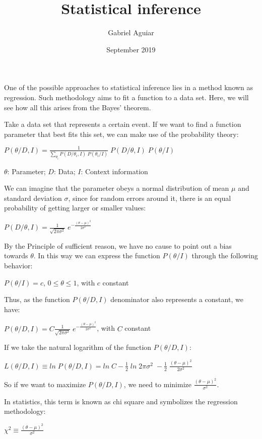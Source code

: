 \documentclass{article}
\title{Statistical inference}
\author{Gabriel Aguiar}
\date{September 2019}
\begin{document}
\maketitle

One of the possible approaches to statistical inference lies in a method known as regression. Such methodology aims to fit a function to a data set. Here, we will see how all this arises from the Bayes' theorem.

Take a data set that represents a certain event. If we want to find a function parameter that best fits this set, we can make use of the probability theory:

\hfill

$P(\theta/D,I) = \frac{1}{\sum\limits_{\theta_{i}} P(D/\theta_{i},I) \; P(\theta_{i}/I)} \; P(D/\theta,I) \; P(\theta/I)$

\hfill

$\theta$: Parameter; $D$: Data; $I$: Context information

\hfill

We can imagine that the parameter obeys a normal distribution of mean $\mu$ and standard deviation $\sigma$, since for random errors around it, there is an equal probability of getting larger or smaller values:

\hfill

$P(D/\theta,I) = \frac{1}{\sqrt{2 \pi \sigma^{2}}} \; e^{-\frac{(\theta - \mu)^{2}}{2 \sigma^{2}}}$

\hfill

By the Principle of sufficient reason, we have no cause to point out a bias towards $\theta$. In this way we can express the function $P(\theta/I)$ through the following behavior:

\hfill

$P(\theta/I) = c$, $0 \leq \theta \leq 1$, with $c$ constant

\hfill

Thus, as the function $P(\theta/D,I)$ denominator also represents a constant, we have:

\hfill

$P(\theta/D,I) = C \frac{1}{\sqrt{2 \pi \sigma^{2}}} \; e^{-\frac{(\theta - \mu)^{2}}{2 \sigma^{2}}}$, with $C$ constant

\hfill

If we take the natural logarithm of the function $P(\theta/D,I)$:

\hfill

$L(\theta/D,I) \equiv ln \; P(\theta/D,I) = ln \; C - \frac{1}{2} \; ln \; 2 \pi \sigma^{2} \; -\frac{1}{2} \; \frac{(\theta - \mu)^{2}}{2 \sigma^{2}}$

\hfill

So if we want to maximize $P(\theta/D,I)$, we need to minimize $\frac{(\theta - \mu)^{2}}{\sigma^{2}}$.

\hfill

In statistics, this term is known as chi square and symbolizes the regression methodology:

\hfill

$\chi^{2} \equiv \frac{(\theta - \mu)^{2}}{\sigma^{2}}$
\end{document}
